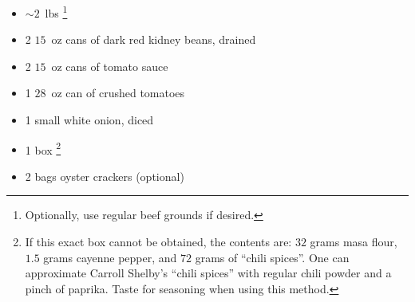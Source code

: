 
\RequirePackage{../recipe}





\thispagestyle{firstpage}



\ingredients
\begin{itemize}
    \renewcommand{\thefootnote}{\arabic{footnote}}
    \item $\sim 2$~lbs \renewcommand{\thefootnote}{\fnsymbol{footnote}}\footnote[2]{Optionally, use regular beef grounds if desired.}
    \item 2 $15$~oz cans of dark red kidney beans, drained
    \item 2 $15$~oz cans of tomato sauce
    \item 1 $28$~oz can of crushed tomatoes
    \item 1 small white onion, diced
    \renewcommand{\thefootnote}{\arabic{footnote}}
    \item 1 box \renewcommand{\thefootnote}{\fnsymbol{footnote}}\footnote[3]{If this exact box cannot be obtained, the contents are: $32$ grams masa flour, $1.5$ grams cayenne pepper, and $72$ grams of ``chili spices''. One can approximate Carroll Shelby's ``chili spices'' with regular chili powder and a pinch of paprika. Taste for seasoning when using this method.}

    \item 2 bags oyster crackers (optional)
\end{itemize}

